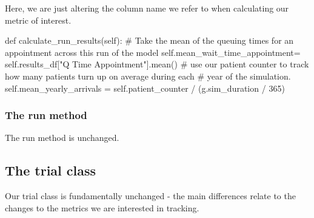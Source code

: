 \documentclass[
  letterpaper,
  DIV=11,
  numbers=noendperiod]{scrreprt}
\newenvironment{Shaded}{}{}
\newcommand{\CommentTok}[1]{\textcolor[rgb]{0.42,0.45,0.49}{#1}}
\newcommand{\DecValTok}[1]{\textcolor[rgb]{0.00,0.36,0.77}{#1}}
\newcommand{\KeywordTok}[1]{\textcolor[rgb]{0.84,0.23,0.29}{#1}}
\newcommand{\NormalTok}[1]{\textcolor[rgb]{0.14,0.16,0.18}{#1}}
\newcommand{\OperatorTok}[1]{\textcolor[rgb]{0.14,0.16,0.18}{#1}}
\newcommand{\StringTok}[1]{\textcolor[rgb]{0.01,0.18,0.38}{#1}}
\newcommand{\VariableTok}[1]{\textcolor[rgb]{0.89,0.38,0.04}{#1}}
\begin{document}
Here, we are just altering the column name we refer to when calculating
our metric of interest.

\begin{Shaded}
\begin{Highlighting}[]
    \KeywordTok{def}\NormalTok{ calculate\_run\_results(}\VariableTok{self}\NormalTok{):}
        \CommentTok{\# Take the mean of the queuing times for an appointment across this run of the model}
        \VariableTok{self}\NormalTok{.mean\_wait\_time\_appointment}\OperatorTok{=} \VariableTok{self}\NormalTok{.results\_df[}\StringTok{"Q Time Appointment"}\NormalTok{].mean()}
        \CommentTok{\# use our patient counter to track how many patients turn up on average during each}
        \CommentTok{\# year of the simulation.}
        \VariableTok{self}\NormalTok{.mean\_yearly\_arrivals }\OperatorTok{=} \VariableTok{self}\NormalTok{.patient\_counter }\OperatorTok{/}\NormalTok{ (g.sim\_duration }\OperatorTok{/} \DecValTok{365}\NormalTok{)}
\end{Highlighting}
\end{Shaded}

\subsubsection{The run method}\label{the-run-method-8}

The run method is unchanged.

\subsection{The trial class}\label{the-trial-class-10}

Our trial class is fundamentally unchanged - the main differences relate
to the changes to the metrics we are interested in tracking.
\end{document}
